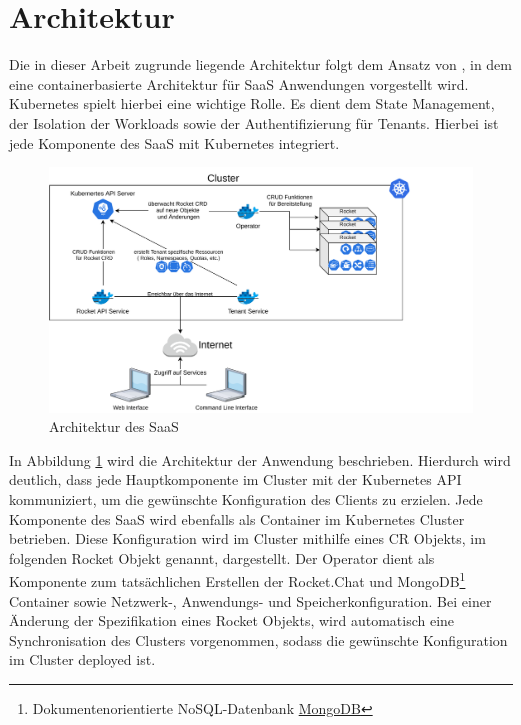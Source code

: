 \section{Architektur}
\label{sec:komponenten:architektur}

Die in dieser Arbeit zugrunde liegende Architektur folgt dem Ansatz von \cite{Truyen2016}, in dem eine containerbasierte
Architektur für \ac{SaaS} Anwendungen vorgestellt wird. Kubernetes spielt hierbei eine wichtige Rolle. Es dient dem State
Management, der Isolation der Workloads sowie der Authentifizierung für Tenants. Hierbei ist jede Komponente des \ac{SaaS}
mit Kubernetes integriert.

\begin{figure}[h]
  \includegraphics[width=45em]{gfx/chapters/3_komponenten/saas_architecture.pdf}
  \caption{Architektur des \ac{SaaS}}
  \label{fig:architektur}
\end{figure}

In Abbildung \ref{fig:architektur} wird die Architektur der Anwendung beschrieben.
Hierdurch wird deutlich, dass jede Hauptkomponente im Cluster mit der Kubernetes API kommuniziert,
um die gewünschte Konfiguration des Clients zu erzielen.
Jede Komponente des \ac{SaaS} wird ebenfalls als Container im Kubernetes Cluster betrieben.
Diese Konfiguration wird im Cluster mithilfe eines \ac{CR} Objekts, im folgenden Rocket Objekt genannt, dargestellt.
Der Operator dient als Komponente zum tatsächlichen
Erstellen der Rocket.Chat und MongoDB\footnote{Dokumentenorientierte NoSQL-Datenbank \href{https://www.mongodb.com/}{MongoDB}}
Container sowie Netzwerk-, Anwendungs- und Speicherkonfiguration.
Bei einer Änderung der Spezifikation eines Rocket Objekts, wird automatisch eine Synchronisation des 
Clusters vorgenommen, sodass die gewünschte Konfiguration im Cluster deployed ist.

